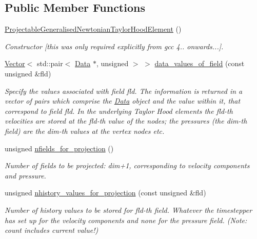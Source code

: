 \subsection*{Public Member Functions}
\begin{DoxyCompactItemize}
\item 
\hyperlink{classoomph_1_1ProjectableGeneralisedNewtonianTaylorHoodElement_a84e5e27501f7bd74aeb2ed595b674884}{Projectable\+Generalised\+Newtonian\+Taylor\+Hood\+Element} ()
\begin{DoxyCompactList}\small\item\em Constructor \mbox{[}this was only required explicitly from gcc 4.. onwards...\mbox{]}. \end{DoxyCompactList}\item 
\hyperlink{classoomph_1_1Vector}{Vector}$<$ std\+::pair$<$ \hyperlink{classoomph_1_1Data}{Data} $\ast$, unsigned $>$ $>$ \hyperlink{classoomph_1_1ProjectableGeneralisedNewtonianTaylorHoodElement_a1734ba15f3c3062571a83c3e23933e6a}{data\+\_\+values\+\_\+of\+\_\+field} (const unsigned \&fld)
\begin{DoxyCompactList}\small\item\em Specify the values associated with field fld. The information is returned in a vector of pairs which comprise the \hyperlink{classoomph_1_1Data}{Data} object and the value within it, that correspond to field fld. In the underlying Taylor Hood elements the fld-\/th velocities are stored at the fld-\/th value of the nodes; the pressures (the dim-\/th field) are the dim-\/th values at the vertex nodes etc. \end{DoxyCompactList}\item 
unsigned \hyperlink{classoomph_1_1ProjectableGeneralisedNewtonianTaylorHoodElement_a34bc56caf12c251a15509f1be90debf1}{nfields\+\_\+for\+\_\+projection} ()
\begin{DoxyCompactList}\small\item\em Number of fields to be projected\+: dim+1, corresponding to velocity components and pressure. \end{DoxyCompactList}\item 
unsigned \hyperlink{classoomph_1_1ProjectableGeneralisedNewtonianTaylorHoodElement_a5a7f30af042df73e5a62a29830333b33}{nhistory\+\_\+values\+\_\+for\+\_\+projection} (const unsigned \&fld)
\begin{DoxyCompactList}\small\item\em Number of history values to be stored for fld-\/th field. Whatever the timestepper has set up for the velocity components and none for the pressure field. (Note\+: count includes current value!) \end{DoxyCompactList}\item 

\end{DoxyCompactItemize}
